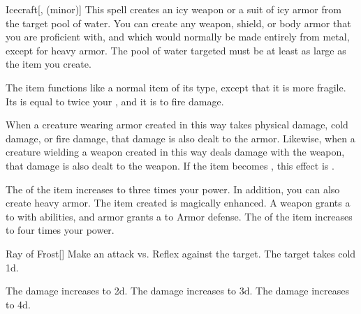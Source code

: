 \lowercase{\hypertarget{spell:Icecraft}{}}\label{spell:Icecraft}
\begin{freeability}[Rank 1]{\hypertarget{spell:Icecraft}{Icecraft}}[,  (minor)]
This spell creates an icy weapon or a suit of icy armor from the target pool of water.
You can create any weapon, shield, or body armor that you are proficient with, and which would normally be made entirely from metal, except for heavy armor.
The pool of water targeted must be at least as large as the item you create.

The item functions like a normal item of its type, except that it is more fragile.
Its  is equal to twice your , and it is  to fire damage.

When a creature wearing armor created in this way takes physical damage, cold damage, or fire damage, that damage is also dealt to the armor.
Likewise, when a creature wielding a weapon created in this way deals damage with the weapon, that damage is also dealt to the weapon.
If the item becomes , this effect is .

\rankline
{} The  of the item increases to three times your power.
In addition, you can also create heavy armor.
 The item created is magically enhanced.
A weapon grants a   to  with  abilities,
and armor grants a   to Armor defense.
 The  of the item increases to four times your power.
\end{freeability}
\vspace{0.25em}



\lowercase{\hypertarget{spell:Ray of Frost}{}}\label{spell:Ray of Frost}
\begin{freeability}[Rank 1]{\hypertarget{spell:Ray of Frost}{Ray of Frost}}[]
Make an attack vs. Reflex against the target.
\hit The target takes cold  \plus1d.

\rankline
{} The damage increases to  \plus2d.
 The damage increases to  \plus3d.
 The damage increases to  \plus4d.
\end{freeability}
\vspace{0.25em}



